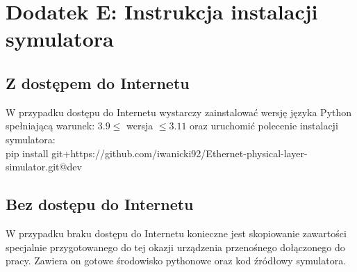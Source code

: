 \setcounter{secnumdepth}{0}
\section*{Dodatek E: Instrukcja instalacji symulatora}

\subsection{Z dostępem do Internetu}
W przypadku dostępu do Internetu wystarczy zainstalować wersję języka Python spełniającą warunek: $3.9 \le$ wersja $\le 3.11$ oraz uruchomić polecenie instalacji symulatora: \\ pip install git+https://github.com/iwanicki92/Ethernet-physical-layer-simulator.git@dev

\subsection{Bez dostępu do Internetu}
W przypadku braku dostępu do Internetu konieczne jest skopiowanie zawartości specjalnie przygotowanego do tej okazji urządzenia przenośnego dołączonego do pracy. Zawiera on gotowe środowisko pythonowe oraz kod źródłowy symulatora.

